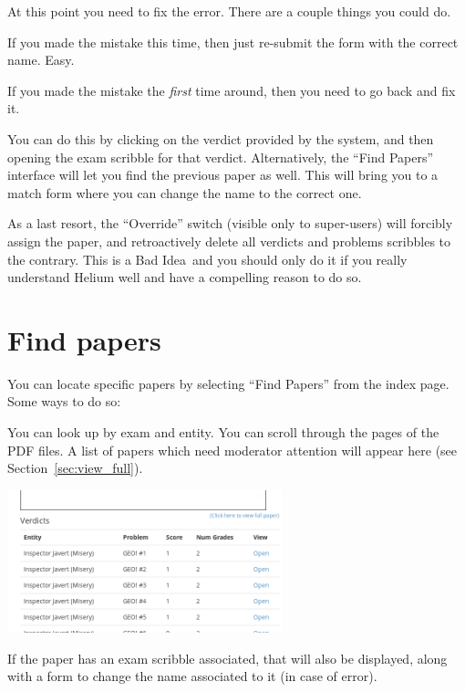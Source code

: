 At this point you need to fix the error.
There are a couple things you could do.
\begin{itemize}
	\ii If you made the mistake this time,
	then just re-submit the form with the correct name. Easy.

	\ii If you made the mistake the \emph{first} time around,
	then you need to go back and fix it.

	You can do this by clicking on the verdict provided by the system,
	and then opening the exam scribble for that verdict.
	Alternatively, the ``Find Papers'' interface will let you find
	the previous paper as well.
	This will bring you to a match form where you can change the
	name to the correct one.

	\ii As a last resort,
	the ``Override'' switch (visible only to super-users)
	will forcibly assign the paper,
	and retroactively delete all verdicts and
	problems scribbles to the contrary.
	This is a Bad Idea\texttrademark\ and you should only do it
	if you really understand Helium well and have a compelling reason to do so.
\end{itemize}

\section{Find papers}
You can locate specific papers
by selecting ``Find Papers'' from the index page.
Some ways to do so:
\begin{itemize}
	\ii You can look up by exam and entity.
	\ii You can scroll through the pages of the PDF files.
	\ii A list of papers which need moderator attention
	will appear here (see Section~\ref{sec:view_full}).
\end{itemize}

\begin{center}
	\includegraphics[width=0.6\textwidth]{images/viewpaper2.png}
\end{center}

If the paper has an exam scribble associated,
that will also be displayed,
along with a form to change the name associated to it
(in case of error).

